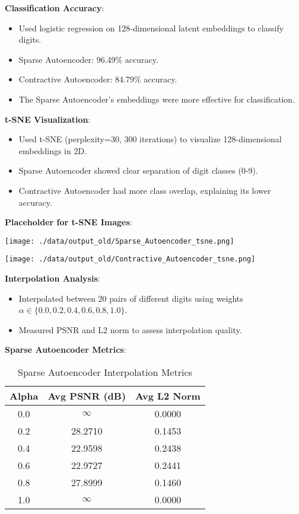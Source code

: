 \documentclass[12pt]{article}
\begin{document}
	\textbf{Classification Accuracy}:
	\begin{itemize}
		\item Used logistic regression on 128-dimensional latent embeddings to classify digits.
		\item Sparse Autoencoder: 96.49\% accuracy.
		\item Contractive Autoencoder: 84.79\% accuracy.
		\item The Sparse Autoencoder's embeddings were more effective for classification.
	\end{itemize}
	
	\textbf{t-SNE Visualization}:
	\begin{itemize}
		\item Used t-SNE (perplexity=30, 300 iterations) to visualize 128-dimensional embeddings in 2D.
		\item Sparse Autoencoder showed clear separation of digit classes (0-9).
		\item Contractive Autoencoder had more class overlap, explaining its lower accuracy.
	\end{itemize}
	\textbf{Placeholder for t-SNE Images}:
	\begin{center}
		\texttt{[image: ./data/output\_old/Sparse\_Autoencoder\_tsne.png]}
	\end{center}
	\begin{center}
		\texttt{[image: ./data/output\_old/Contractive\_Autoencoder\_tsne.png]}
	\end{center}
	
	\textbf{Interpolation Analysis}:
	\begin{itemize}
		\item Interpolated between 20 pairs of different digits using weights \(\alpha \in \{0.0, 0.2, 0.4, 0.6, 0.8, 1.0\}\).
		\item Measured PSNR and L2 norm to assess interpolation quality.
	\end{itemize}
	\textbf{Sparse Autoencoder Metrics}:
	\begin{table}[h]
		\centering
		\begin{tabular}{ccc}
			\toprule
			Alpha & Avg PSNR (dB) & Avg L2 Norm \\
			\midrule
			0.0 & $\infty$ & 0.0000 \\
			0.2 & 28.2710 & 0.1453 \\
			0.4 & 22.9598 & 0.2438 \\
			0.6 & 22.9727 & 0.2441 \\
			0.8 & 27.8999 & 0.1460 \\
			1.0 & $\infty$ & 0.0000 \\
			\bottomrule
		\end{tabular}
		\caption{Sparse Autoencoder Interpolation Metrics}
	\end{table}
	
\end{document}
